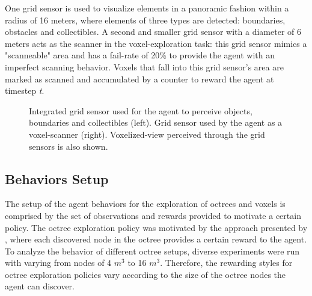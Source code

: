 One grid sensor is used to visualize elements in a panoramic fashion within a radius of 16 meters, where elements of three types are detected: boundaries, obstacles and collectibles.
A second and smaller grid sensor with a diameter of 6 meters acts as the scanner in the voxel-exploration task: this grid sensor mimics a "scanneable" area and has a fail-rate of 20\% to provide the agent with an imperfect scanning behavior. Voxels that fall into this grid sensor's area are marked as scanned and accumulated by a counter to reward the agent at timestep \textit{t}. 

\begin{figure}[!ht]
    \centering
    \caption{Integrated grid sensor used for the agent to perceive objects, boundaries and collectibles (left). Grid sensor used by the agent as a voxel-scanner (right). Voxelized-view perceived through the grid sensors is also shown.}
    \label{fig:unity-island-gridsensors}
\end{figure}

 
\subsection{Behaviors Setup}\label{chap:4:behaviors}

The setup of the agent behaviors for the exploration of octrees and voxels is comprised by the set of observations and rewards provided to motivate a certain policy. The octree exploration policy was motivated by the approach presented by \textcite{chen2019learning}, where each discovered node in the octree provides a certain reward to the agent. To analyze the behavior of different octree setups, diverse experiments were run with varying from nodes of 4 $m^3$ to 16 $m^3$. Therefore, the rewarding styles for octree exploration policies vary according to the size of the octree nodes the agent can discover.



